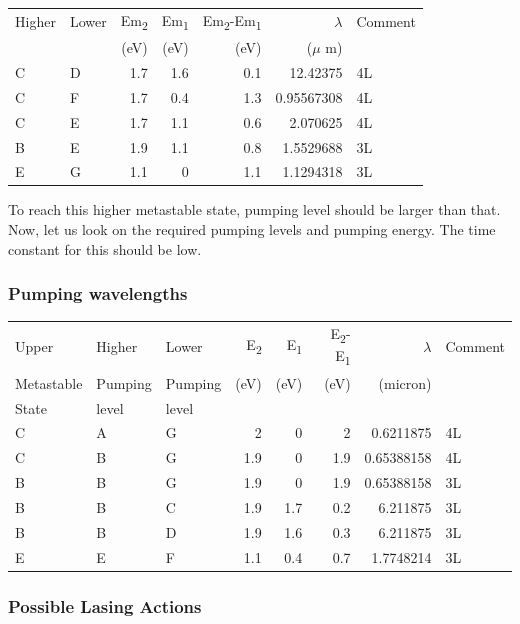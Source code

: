 \documentclass[a4paper,11pt]{article}
\begin{document}
\begin{center}
\begin{tabular}{llrrrrl}
\hline
Higher & Lower & Em\textsubscript{2} & Em\textsubscript{1} & Em\textsubscript{2}-Em\textsubscript{1} & \(\lambda\) & Comment\\
 &  & (eV) & (eV) & (eV) & (\(\mu\) m) & \\
\hline
C & D & 1.7 & 1.6 & 0.1 & 12.42375 & 4L\\
C & F & 1.7 & 0.4 & 1.3 & 0.95567308 & 4L\\
C & E & 1.7 & 1.1 & 0.6 & 2.070625 & 4L\\
B & E & 1.9 & 1.1 & 0.8 & 1.5529688 & 3L\\
E & G & 1.1 & 0 & 1.1 & 1.1294318 & 3L\\
\hline
\end{tabular}
\end{center}


To reach this higher metastable state, pumping level should be larger than that. Now, let us look on the required pumping levels and pumping energy. The time constant for this should be low.

\subsubsection*{Pumping wavelengths}
\label{sec:org02895f2}
\begin{center}
\begin{tabular}{lllrrrrl}
\hline
Upper & Higher & Lower & E\textsubscript{2} & E\textsubscript{1} & E\textsubscript{2}-E\textsubscript{1} & \(\lambda\) & Comment\\
Metastable & Pumping & Pumping & (eV) & (eV) & (eV) & (micron) & \\
State & level & level &  &  &  &  & \\
\hline
C & A & G & 2 & 0 & 2 & 0.6211875 & 4L\\
C & B & G & 1.9 & 0 & 1.9 & 0.65388158 & 4L\\
B & B & G & 1.9 & 0 & 1.9 & 0.65388158 & 3L\\
B & B & C & 1.9 & 1.7 & 0.2 & 6.211875 & 3L\\
B & B & D & 1.9 & 1.6 & 0.3 & 6.211875 & 3L\\
E & E & F & 1.1 & 0.4 & 0.7 & 1.7748214 & 3L\\
\hline
\end{tabular}
\end{center}

\subsubsection*{Possible Lasing Actions}
\label{sec:org3efddd7}
\end{document}
